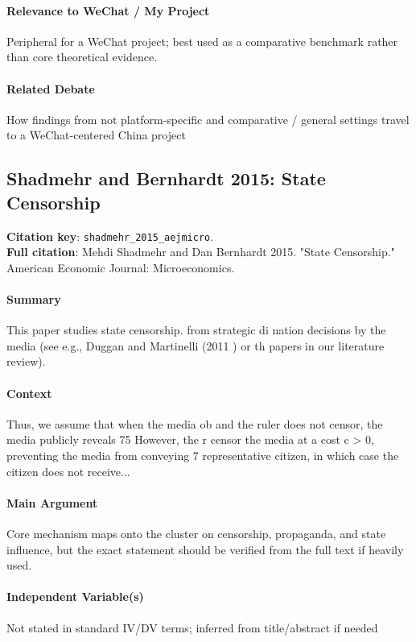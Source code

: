 \documentclass[12pt]{article}
\begin{document}
\paragraph{Relevance to WeChat / My Project} Peripheral for a WeChat project; best used as a comparative benchmark rather than core theoretical evidence.

\paragraph{Related Debate} How findings from not platform-specific and comparative / general settings travel to a WeChat-centered China project


\subsection{Shadmehr and Bernhardt 2015: State Censorship}
\textbf{Citation key}: \texttt{shadmehr\_2015\_aejmicro}.\\
\textbf{Full citation}: Mehdi Shadmehr and Dan Bernhardt 2015. "State Censorship." American Economic Journal: Microeconomics.

\paragraph{Summary} This paper studies state censorship. from strategic di nation decisions by the media (see e.g., Duggan and Martinelli (2011 ) or th papers in our literature review).

\paragraph{Context} Thus, we assume that when the media ob and the ruler does not censor, the media publicly reveals 75 However, the r censor the media at a cost c > 0, preventing the media from conveying 7 representative citizen, in which case the citizen does not receive...

\paragraph{Main Argument} Core mechanism maps onto the cluster on censorship, propaganda, and state influence, but the exact statement should be verified from the full text if heavily used.

\paragraph{Independent Variable(s)} Not stated in standard IV/DV terms; inferred from title/abstract if needed
\end{document}

